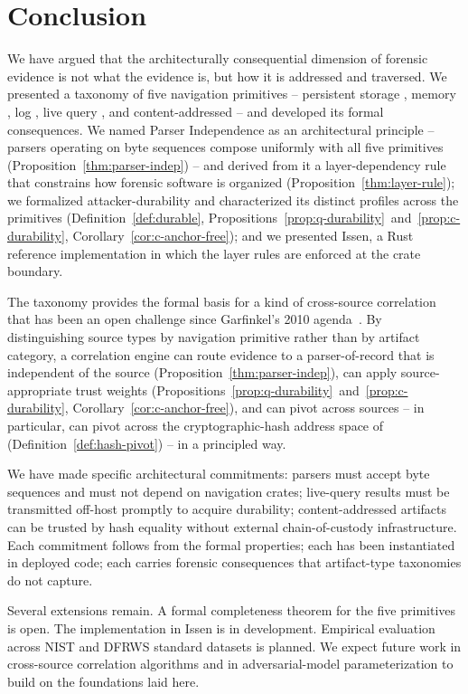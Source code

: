 \section{Conclusion}
\label{sec:conclusion}

We have argued that the architecturally consequential dimension of forensic
evidence is not what the evidence is, but how it is addressed and
traversed. We presented a taxonomy of five navigation primitives --
persistent storage , memory , log , live query
, and content-addressed  -- and developed its formal
consequences. We named Parser Independence as an architectural principle -- parsers
operating on byte sequences compose uniformly with all five primitives
(Proposition~\ref{thm:parser-indep}) -- and derived from it a layer-dependency
rule that constrains how forensic software is organized
(Proposition~\ref{thm:layer-rule}); we
formalized attacker-durability and characterized its distinct profiles
across the primitives (Definition~\ref{def:durable},
Propositions~\ref{prop:q-durability}~and~\ref{prop:c-durability},
Corollary~\ref{cor:c-anchor-free}); and we presented Issen, a Rust
reference implementation in which the layer rules are enforced at the
crate boundary.

The taxonomy provides the formal basis for a kind of cross-source
correlation that has been an open challenge since Garfinkel's 2010
agenda~\cite{garfinkel2010digital}. By distinguishing source types by
navigation primitive rather than by artifact category, a correlation
engine can route evidence to a parser-of-record that is independent of
the source (Proposition~\ref{thm:parser-indep}), can apply source-appropriate
trust weights (Propositions~\ref{prop:q-durability}~and~\ref{prop:c-durability},
Corollary~\ref{cor:c-anchor-free}), and can pivot across sources -- in
particular, can pivot across the cryptographic-hash address space of
 (Definition~\ref{def:hash-pivot}) -- in a principled way.

We have made specific architectural commitments: parsers must accept
byte sequences and must not depend on navigation crates; live-query results
must be transmitted off-host promptly to acquire durability; content-addressed
artifacts can be trusted by hash equality without external chain-of-custody
infrastructure. Each commitment follows from the formal properties; each
has been instantiated in deployed code; each carries forensic
consequences that artifact-type taxonomies do not capture.

Several extensions remain. A formal completeness theorem for the five
primitives is open. The  implementation in Issen is in development.
Empirical evaluation across NIST and DFRWS standard datasets is planned.
We expect future work in cross-source correlation algorithms and in
adversarial-model parameterization to build on the foundations laid here.

